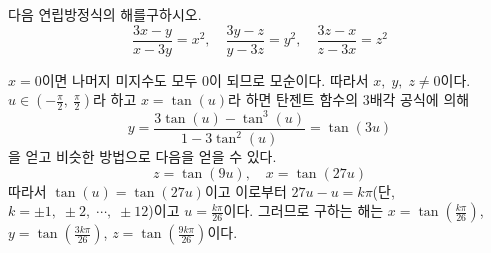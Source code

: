 \documentclass[11pt, a4paper]{book}
\begin{document}
\vspace{1em}
\begin{example}
	다음 연립방정식의 해를구하시오.
	\begin{equation*}
		\frac{3x-y}{x-3y} =x^{2}, \quad \frac{3y-z}{y-3z} =y^{2}, \quad \frac{3z-x}{z-3x} =z^{2}
	\end{equation*}
	\begin{solution}
$x=0$이면 나머지 미지수도 모두 $0$이 되므로 모순이다. 따라서 $x,\;y,\;z \neq 0$이다. $u \in \left(-\frac{\pi}{2}, \: \frac{\pi}{2}\right)$라 하고 $x=\tan(u)$라 하면 탄젠트 함수의 $3$배각 공식에 의해
\begin{equation*}
y = \frac{3 \tan(u)-\tan^{3}(u)}{1-3\tan^{2}(u)} = \tan(3u)
\end{equation*}	
을 얻고 비슷한 방법으로 다음을 얻을 수 있다.
\begin{equation*}
	z= \tan(9u), \quad x = \tan(27u)
\end{equation*}
따라서 $\tan(u) =\tan(27u)$이고 이로부터 $27u-u=k \pi$(단, $k=\pm 1, \;\pm2,\; \cdots, \;\pm12$)이고 $u=\frac{k \pi}{26}$이다. 그러므로 구하는 해는 $x=\tan\left(\frac{k\pi}{26}\right)$, $y=\tan\left(\frac{3k\pi}{26}\right)$, $z=\tan\left(\frac{9k\pi}{26}\right)$이다.
\end{solution}
\end{example}
\vspace{1em}
\end{document}
